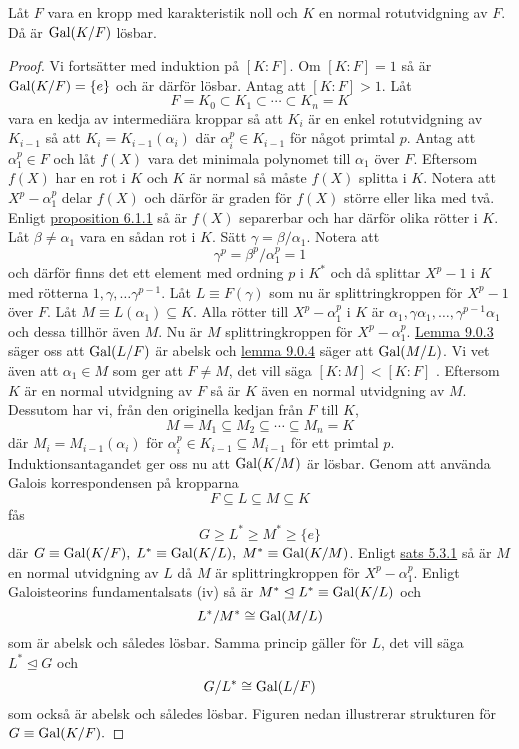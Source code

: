 \documentclass{article}
\newcommand{\gal}[0]{\textnormal{Gal}}
\theoremstyle{definition}
\begin{document}
\hypertarget{sats10.0.1}{}
\begin{mytheo}{}{}
  Låt $F$ vara en kropp med karakteristik noll och $K$ en normal rotutvidgning av $F$. Då är $\gal(K/F)$ lösbar. 
\end{mytheo}

\begin{proof}
  Vi fortsätter med induktion på $[K:F]$. Om $[K:F] = 1$ så är $\gal(K/F) = \{e\}$ och är därför lösbar. Antag att $[K:F] > 1$. Låt
  \[F = K_0 \subset K_1 \subset \cdots \subset K_n = K\]
  vara en kedja av intermediära kroppar så att $K_i$ är en enkel rotutvidgning av $K_{i-1}$ så att $K_i = K_{i-1}(\alpha_i)$ där $\alpha_i^p \in K_{i-1}$ 
  för något primtal $p$. Antag att $\alpha_1^p \in F$ och låt $f(X)$ vara det minimala polynomet till $\alpha_1$ över $F$. Eftersom 
  $f(X)$ har en rot i $K$ och $K$ är normal så måste $f(X)$ splitta i $K$. Notera att $X^p - \alpha_1^p$ delar $f(X)$ och därför är graden 
  för $f(X)$ större eller lika med två. Enligt \hyperlink{irrsep}{proposition 6.1.1} så är $f(X)$ separerbar och har därför 
  olika rötter i $K$. Låt $\beta \neq \alpha_1$ vara en sådan rot i $K$. Sätt $\gamma = \beta/\alpha_1$. 
  Notera att 
  \[\gamma^p = \beta^p/\alpha_1^p = 1\]
  och därför finns det ett element med ordning $p$ i $K^*$ och då splittar $X^p - 1$ i $K$ med rötterna $1, \gamma, \ldots \gamma^{p-1}$. 
  Låt $L \equiv F(\gamma)$ som nu är splittringkroppen för $X^p - 1$ över $F$. Låt $M \equiv L(\alpha_1) \subseteq K$. Alla rötter till $X^p - \alpha_1^p$
  i $K$ är $\alpha_1, \gamma \alpha_1, \ldots, \gamma^{p-1}\alpha_1$ och dessa tillhör även $M$. Nu är $M$ splittringkroppen för $X^p - \alpha_1^p$.
  \hyperlink{lemma10.0.3}{Lemma 9.0.3} säger oss att $\gal(L/F)$ är abelsk och \hyperlink{lemma10.0.4}{lemma 9.0.4} säger att 
  $\gal(M/L)$. Vi vet även att $\alpha_1 \in M$ som ger att $F \neq M$, det vill säga $[K:M] < [K:F]$ . Eftersom $K$ är en normal utvidgning 
  av $F$ så är $K$ även en normal utvidgning av $M$. Dessutom har vi, från den originella kedjan från $F$ till $K$,
  \[M = M_1 \subseteq M_2 \subseteq \cdots \subseteq M_n = K\]
  där $M_i = M_{i-1}(\alpha_i)$ för $\alpha_i^p \in K_{i-1} \subseteq M_{i-1}$ för ett primtal $p$. Induktionsantagandet
  ger oss nu att $\gal(K/M)$ är lösbar. 
  Genom att använda Galois korrespondensen på kropparna 
  \[F \subseteq L \subseteq M \subseteq K\]
  fås 
  \[G \geq L^* \geq M^* \geq \{e\}\]
  där $G \equiv \gal(K/F), \; L^* \equiv \gal(K/L), \; M^* \equiv \gal(K/M)$. Enligt \hyperlink{sats6.3.1}{sats 5.3.1} så är $M$ en normal utvidgning av $L$
  då $M$ är splittringkroppen för $X^p - \alpha_1^p$. Enligt Galoisteorins fundamentalsats (iv) så är $M^* \trianglelefteq L^* \equiv \gal(K/L)$ och 
  \[L^*/M^* \cong \gal(M/L)\]
  som är abelsk och således lösbar. Samma princip gäller för $L$, det vill säga $L^* \trianglelefteq G$ och 
  \[G/L^* \cong \gal(L/F)\]
  som också är abelsk och således lösbar. Figuren nedan illustrerar strukturen för $G \equiv \gal(K/F).$


\end{proof}
\end{document}
